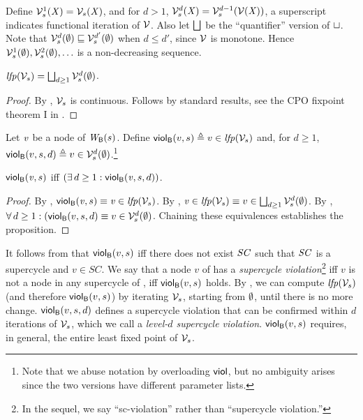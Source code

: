 Define $\VFsi{s}{\XS}{1} = \VFs{s}{\XS}$, and for $d > 1$, 
$\VFsi{s}{\XS}{d} = \VFsi{s}{\VF{\XS}}{d-1}$, \ie a superscript indicates functional iteration
of $\VFsymb$. Also let $\JOIN$ be the ``quantifier'' version of $\join$.
Note that $\VFsi{s}{\ewfg}{d} \subg \VFsi{s}{\ewfg}{d'}$ when $d \le d'$, since $\VFsymb$
is monotone.
Hence $\VFsi{s}{\ewfg}{1}, \VFsi{s}{\ewfg}{2}, \ldots$ is a non-decreasing sequence.

\begin{proposition}  \label{prop:computeLFP}
$\lfp{\VFsymb_s} = \JOIN_{d \ge 1} \VFsi{s}{\ewfg}{d}$.
\end{proposition}
%
\begin{proof}
By , $\VFsymb_s$ is continuous. Follows by standard results, \eg see the CPO fixpoint theorem I in 
.
\end{proof}



\begin{definition}
\label{def:supercycle-violation}
\label{def:supercycle.violation}
\label{defn:supercycle.violation}
Let $\ndv$ be a node of $\wfg{\B}{s}$. Define
$\scV{v}{s} \df v \in \lfp{\VFsymb_s}$ and, for $d \ge 1$,
$\scVd{v}{d}{s} \df v \in \VFsi{s}{\ewfg}{d}$.\footnote{Note that
we abuse notation by overloading $\SMATHID{viol}$, but no ambiguity arises since the two versions have
different parameter lists.}
\end{definition}

\begin{proposition}
\label{prop:globViol-equiv-globViolDist}
$\scV{\ndv}{s}$ iff  $(\ex d \ge 1: \scVd{\ndv}{d}{s})$.
\end{proposition}
%
\begin{proof}
By , $\scV{\ndv}{s} \ev \ndv \in \lfp{\VFsymb_s}$.
By , $\ndv \in \lfp{\VFsymb_s} \ev v \in \JOIN_{d \ge 1} \VFsi{s}{\ewfg}{d}$.
By , $\fa d \ge 1: (\scVd{v}{d}{s} \ev v \in \VFsi{s}{\ewfg}{d}$.
Chaining these equivalences establishes the proposition.
\end{proof}

It follows from  that $\scV{v}{s}$ iff there does not exist $\SC$ such that $\SC$ is a supercycle and $v \in SC$.
We say that a node $v$ of  has a \emph{supercycle violation}\footnote{In the sequel, we say ``sc-violation'' rather than ``supercycle violation.''} iff $v$ is not a node in any supercycle of , 
\ie iff $\scV{v}{s}$ holds. 
By , we can compute $\lfp{\VFsymb_s}$ (and therefore $\scV{v}{s}$) by iterating $\VFsymb_s$, starting from $\ewfg$, until there is no more change.
$\scVd{v}{d}{s}$ defines a supercycle violation that can be confirmed within $d$ iterations of $\VFsymb_s$, which we call a \emph{level-$d$ supercycle violation}.
$\scV{v}{s}$ requires, in general, the entire least fixed point of $\VFsymb_s$.


